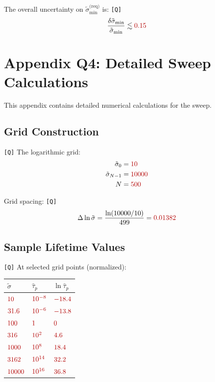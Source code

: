 \documentclass[11pt,a4paper]{article}
\newcommand{\Qval}[1]{\textcolor{red!70!black}{#1}}
\newcommand{\tagQ}{\textcolor{red!70!black}{\texttt{[Q]}}}
\theoremstyle{definition}
\begin{document}
The overall uncertainty on $\tilde{\sigma}_{\min}^{\text{(req)}}$ is: \tagQ{}
\begin{equation}
\label{eq:robust-unc}
\frac{\delta\tilde{\sigma}_{\min}}{\tilde{\sigma}_{\min}} \lesssim \Qval{0.15}
\end{equation}

\section{Appendix Q4: Detailed Sweep Calculations}
\label{app:q4}

\begin{quarantinebox}
This appendix contains detailed numerical calculations for the sweep.
\end{quarantinebox}

\subsection{Grid Construction}
\label{app:grid}

\tagQ{} The logarithmic grid:
\begin{align}
\label{eq:grid-min}
\tilde{\sigma}_0 &= \Qval{10} \\
\label{eq:grid-max}
\tilde{\sigma}_{N-1} &= \Qval{10000} \\
\label{eq:grid-n}
N &= \Qval{500}
\end{align}

Grid spacing: \tagQ{}
\begin{equation}
\label{eq:grid-spacing}
\Delta\ln\tilde{\sigma} = \frac{\ln(10000/10)}{499} = \Qval{0.01382}
\end{equation}

\subsection{Sample Lifetime Values}
\label{app:sample-tau}

\tagQ{} At selected grid points (normalized):

\begin{center}
\begin{tabular}{lll}
\toprule
$\tilde{\sigma}$ & $\hat{\tau}_p$ & $\ln\hat{\tau}_p$ \\
\midrule
$\Qval{10}$ & $\Qval{10^{-8}}$ & $\Qval{-18.4}$ \\
$\Qval{31.6}$ & $\Qval{10^{-6}}$ & $\Qval{-13.8}$ \\
$\Qval{100}$ & $\Qval{1}$ & $\Qval{0}$ \\
$\Qval{316}$ & $\Qval{10^{2}}$ & $\Qval{4.6}$ \\
$\Qval{1000}$ & $\Qval{10^{8}}$ & $\Qval{18.4}$ \\
$\Qval{3162}$ & $\Qval{10^{14}}$ & $\Qval{32.2}$ \\
$\Qval{10000}$ & $\Qval{10^{16}}$ & $\Qval{36.8}$ \\
\bottomrule
\end{tabular}
\end{center}
\end{document}

